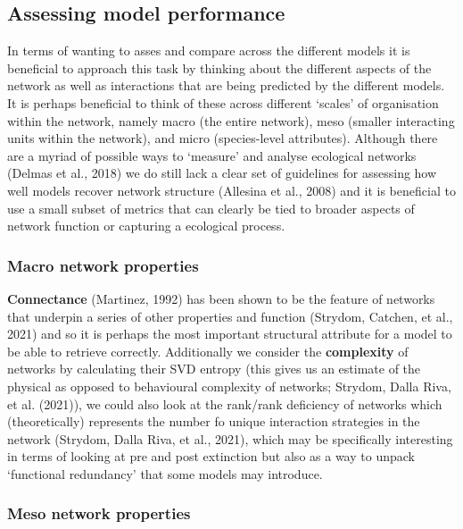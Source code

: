 \documentclass[
]{article}
\begin{document}
\subsection{Assessing model
performance}\label{assessing-model-performance}

In terms of wanting to asses and compare across the different models it
is beneficial to approach this task by thinking about the different
aspects of the network as well as interactions that are being predicted
by the different models. It is perhaps beneficial to think of these
across different `scales' of organisation within the network, namely
macro (the entire network), meso (smaller interacting units within the
network), and micro (species-level attributes). Although there are a
myriad of possible ways to `measure' and analyse ecological networks
(Delmas et al., 2018) we do still lack a clear set of guidelines for
assessing how well models recover network structure (Allesina et al.,
2008) and it is beneficial to use a small subset of metrics that can
clearly be tied to broader aspects of network function or capturing a
ecological process.

\subsubsection{Macro network properties}\label{macro-network-properties}

\textbf{Connectance} (Martinez, 1992) has been shown to be the feature
of networks that underpin a series of other properties and function
(Strydom, Catchen, et al., 2021) and so it is perhaps the most important
structural attribute for a model to be able to retrieve correctly.
Additionally we consider the \textbf{complexity} of networks by
calculating their SVD entropy (this gives us an estimate of the physical
as opposed to behavioural complexity of networks; Strydom, Dalla Riva,
et al. (2021)), we could also look at the rank/rank deficiency of
networks which (theoretically) represents the number fo unique
interaction strategies in the network (Strydom, Dalla Riva, et al.,
2021), which may be specifically interesting in terms of looking at pre
and post extinction but also as a way to unpack `functional redundancy'
that some models may introduce.

\subsubsection{Meso network properties}\label{meso-network-properties}
\end{document}
